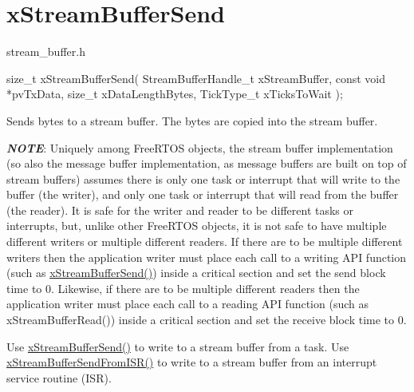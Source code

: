 \hypertarget{group__xStreamBufferSend}{}\section{x\+Stream\+Buffer\+Send}
\label{group__xStreamBufferSend}
stream\+\_\+buffer.\+h


\begin{DoxyPre}
size\_t xStreamBufferSend( StreamBufferHandle\_t xStreamBuffer,
                          const void *pvTxData,
                          size\_t xDataLengthBytes,
                          TickType\_t xTicksToWait );
\end{DoxyPre}


Sends bytes to a stream buffer. The bytes are copied into the stream buffer.

{\itshape {\bfseries N\+O\+TE}}\+: Uniquely among Free\+R\+T\+OS objects, the stream buffer implementation (so also the message buffer implementation, as message buffers are built on top of stream buffers) assumes there is only one task or interrupt that will write to the buffer (the writer), and only one task or interrupt that will read from the buffer (the reader). It is safe for the writer and reader to be different tasks or interrupts, but, unlike other Free\+R\+T\+OS objects, it is not safe to have multiple different writers or multiple different readers. If there are to be multiple different writers then the application writer must place each call to a writing A\+PI function (such as \hyperlink{stream__buffer_8h_a35cdf3b6bf677086b9128782f762499d}{x\+Stream\+Buffer\+Send()}) inside a critical section and set the send block time to 0. Likewise, if there are to be multiple different readers then the application writer must place each call to a reading A\+PI function (such as x\+Stream\+Buffer\+Read()) inside a critical section and set the receive block time to 0.

Use \hyperlink{stream__buffer_8h_a35cdf3b6bf677086b9128782f762499d}{x\+Stream\+Buffer\+Send()} to write to a stream buffer from a task. Use \hyperlink{stream__buffer_8h_a1dab226e99230e01e79bc2b5c0605e44}{x\+Stream\+Buffer\+Send\+From\+I\+S\+R()} to write to a stream buffer from an interrupt service routine (I\+SR).


